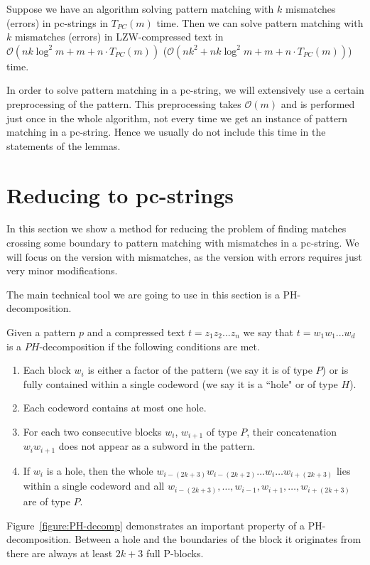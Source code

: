 \documentclass[runningheads]{llncs}
\begin{document}
\begin{theorem}\label{theorem:reduce_to_PCstrings}
Suppose we have an algorithm solving pattern matching with $k$ mismatches (errors) in pc-strings in $T_{PC}(m)$ time. Then we can solve pattern matching with $k$ mismatches (errors) in LZW-compressed text in $\mathcal{O}(nk\log^2 m +m+n\cdot T_{PC}(m))$ ($\mathcal{O}(nk^2+nk\log^2 m +m+n\cdot T_{PC}(m))$) time.
\end{theorem}

In order to solve pattern matching in a pc-string, we will extensively use a certain preprocessing of the pattern. This preprocessing takes $\mathcal{O}(m)$ and is performed just once in the whole algorithm, not every time we get an instance of pattern matching in a pc-string. Hence we usually do not 
include this time in the statements of the lemmas.

\section{Reducing to pc-strings}
\label{section:reduction}

In this section we show a method for reducing the problem of finding matches crossing some boundary to pattern matching with mismatches in a pc-string. We will focus on the version with mismatches, as the version with errors requires just very minor modifications.

The main technical tool we are going to use in this section is a PH-decomposition.

\begin{definition}
Given a pattern $p$ and a compressed text $t=z_1z_2...z_n$ we say that $t=w_1w_1...w_d$ is a $PH$-decomposition if the following conditions are met.
\begin{enumerate}
\item{Each block $w_i$ is either a factor of the pattern (we say it is of type $P$) or is fully contained within a single codeword (we say it is a ``hole" or of type $H$).}
\item{Each codeword contains at most one hole.}
\item{For each two consecutive blocks $w_i$, $w_{i+1}$ of type $P$, their concatenation $w_iw_{i+1}$ does not appear as a subword in the pattern.}
\item{If $w_i$ is a hole, then the whole $w_{i-(2k+3)}w_{i-(2k+2)}\ldots w_i\ldots w_{i+(2k+3)}$ lies within a single codeword and all $w_{i-(2k+3)}, \ldots, w_{i-1}, w_{i+1}, \ldots, w_{i+(2k+3)}$ are of type $P$. }
\end{enumerate}
\end{definition}
Figure~\ref{figure:PH-decomp} demonstrates an important property of a PH-decomposition. Between a hole and the boundaries of the block it originates from there are always at least $2k+3$ full P-blocks.
\end{document}
